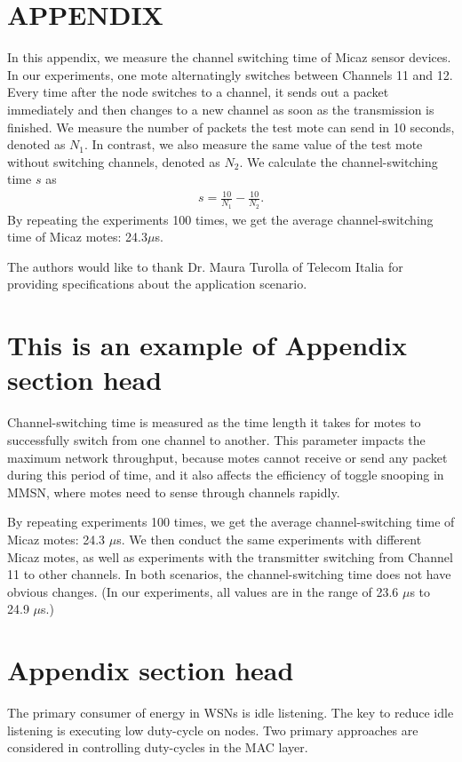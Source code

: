 \documentclass[prodmode,acmtecs]{acmsmall}
\begin{document}
\appendix
\section*{APPENDIX}
\setcounter{section}{1}
In this appendix, we measure
the channel switching time of Micaz \cite{CROSSBOW} sensor devices.
In our experiments, one mote alternatingly switches between Channels
11 and 12. Every time after the node switches to a channel, it sends
out a packet immediately and then changes to a new channel as soon
as the transmission is finished. We measure the
number of packets the test mote can send in 10 seconds, denoted as
$N_{1}$. In contrast, we also measure the same value of the test
mote without switching channels, denoted as $N_{2}$. We calculate
the channel-switching time $s$ as
\begin{eqnarray}%
s=\frac{10}{N_{1}}-\frac{10}{N_{2}}. \nonumber
\end{eqnarray}%
By repeating the experiments 100 times, we get the average
channel-switching time of Micaz motes: 24.3$\mu$s.


\begin{acks}
The authors would like to thank Dr. Maura Turolla of Telecom
Italia for providing specifications about the application scenario.
\end{acks}





\elecappendix

\medskip

\section{This is an example of Appendix section head}

Channel-switching time is measured as the time length it takes for
motes to successfully switch from one channel to another. This
parameter impacts the maximum network throughput, because motes
cannot receive or send any packet during this period of time, and it
also affects the efficiency of toggle snooping in MMSN, where motes
need to sense through channels rapidly.

By repeating experiments 100 times, we get the average
channel-switching time of Micaz motes: 24.3 $\mu$s. We then conduct
the same experiments with different Micaz motes, as well as
experiments with the transmitter switching from Channel 11 to other
channels. In both scenarios, the channel-switching time does not have
obvious changes. (In our experiments, all values are in the range of
23.6 $\mu$s to 24.9 $\mu$s.)

\section{Appendix section head}

The primary consumer of energy in WSNs is idle listening. The key to
reduce idle listening is executing low duty-cycle on nodes. Two
primary approaches are considered in controlling duty-cycles in the
MAC layer.
\end{document}
